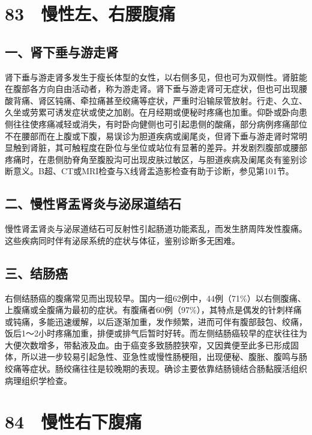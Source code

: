 \protect\hypertarget{text00206.html}{}{}

\section{83　慢性左、右腰腹痛}

\subsection{一、肾下垂与游走肾}

肾下垂与游走肾多发生于瘦长体型的女性，以右侧多见，但也可为双侧性。肾脏能在腹部各方向自由活动者，称为游走肾。肾下垂与游走肾可无症状，但也可出现腰酸背痛、肾区钝痛、牵拉痛甚至绞痛等症状，严重时沿输尿管放射。行走、久立、久坐或劳累可诱发症状或使之加剧。在月经期或便秘时疼痛也加重。仰卧或卧向患侧往往使疼痛减轻或消失，有时卧向健侧也可引起患侧的酸痛，部分病例疼痛部位不在腰部而在上腹或下腹，易误诊为胆道疾病或阑尾炎，但肾下垂与游走肾时常明显触到肾脏，其可触程度在卧位与坐位或站位有显著的差异。并发剧烈腹部或腰部疼痛时，在患侧肋脊角至腹股沟可出现皮肤过敏区，与胆道疾病及阑尾炎有鉴别诊断意义。B超、CT或MRI检查与X线肾盂造影检查有助于诊断，参见第101节。

\subsection{二、慢性肾盂肾炎与泌尿道结石}

慢性肾盂肾炎与泌尿道结石可反射性引起肠道功能紊乱，而发生脐周阵发性腹痛。这些疾病同时伴有泌尿系统的症状与体征，鉴别诊断多无困难。

\subsection{三、结肠癌}

右侧结肠癌的腹痛常见而出现较早。国内一组62例中，44例（71\%）以右侧腹痛、上腹痛或全腹痛为最初的症状。有腹痛者60例（97\%），其特点是偶发的针刺样痛或钝痛，多能迅速缓解，以后逐渐加重，发作频繁，进而可伴有腹部鼓包、绞痛，饭后1～2小时疼痛加重，排便或排气后暂时好转。而左侧结肠癌较早的症状往往为大便次数增多，带黏液及血。由于癌变多致肠腔狭窄，又因粪便至此多已形成固体，所以进一步较易引起急性、亚急性或慢性肠梗阻，出现便秘、腹胀、腹鸣与肠绞痛等症状。肠绞痛往往是较晚期的表现。确诊主要依靠结肠镜结合肠黏膜活组织病理组织学检查。

\protect\hypertarget{text00207.html}{}{}

\section{84　慢性右下腹痛}

